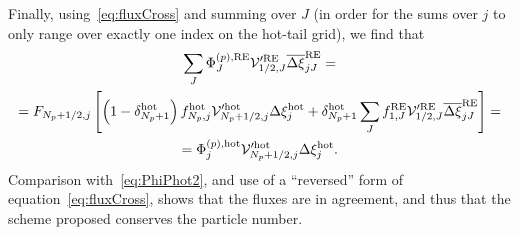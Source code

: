 \documentclass{notes}
\newcommand{\Vp}{\mathcal{V}'}
\begin{document}
    Finally, using~\eqref{eq:fluxCross} and summing over $J$ (in order for the
    sums over $j$ to only range over exactly one index on the hot-tail grid), we
    find that
    \begin{equation}
        \begin{gathered}
            \sum_J \Phi^{(p),{\rm RE}}_{J} \Vp^{\rm RE}_{1/2,J} \overline{\Delta\xi}_{jJ}^{\rm RE} =\\
             = F_{N_p+1/2,j}\left[
                 \left( 1-\delta^{\rm hot}_{N_p+1} \right)
                 f^{\rm hot}_{N_p,j}
                 \Vp^{\rm hot}_{N_p+1/2,j}\Delta\xi_j^{\rm hot}
                 +
                 \delta^{\rm hot}_{N_p+1}\sum_J f_{1,J}^{\rm RE}\Vp^{\rm RE}_{1/2,J}
                 \overline{\Delta\xi}^{\rm RE}_{jJ}
             \right] =\\
             = \Phi^{(p),{\rm hot}}_{j} \Vp^{\rm hot}_{N_p+1/2,j}\Delta\xi^{\rm hot}_j.
        \end{gathered}
    \end{equation}
    Comparison with~\eqref{eq:PhiPhot2}, and use of a ``reversed'' form of
    equation~\eqref{eq:fluxCross}, shows that the fluxes are in agreement, and
    thus that the scheme proposed conserves the particle number.
\end{document}
